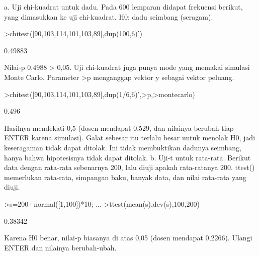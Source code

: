 \documentclass[a4paper,10pt]{article}
\begin{document}
\begin{eulernotebook}
\begin{eulercomment}
\begin{eulercomment}
\begin{eulercomment}
\begin{eulercomment}
\begin{eulercomment}
\begin{eulercomment}
\begin{eulercomment}
\begin{eulercomment}
\begin{eulercomment}
\begin{eulercomment}
\begin{eulercomment}
\begin{eulercomment}
\begin{eulercomment}
\begin{eulercomment}
\begin{eulercomment}
\begin{eulercomment}
\begin{eulercomment}
\begin{eulercomment}
\begin{eulercomment}
\begin{eulercomment}
\begin{eulercomment}
\begin{eulercomment}
\begin{eulercomment}
\end{eulercomment}
\begin{eulercomment}
a. Uji chi-kuadrat untuk dadu. Pada 600 lemparan didapat frekuensi berikut, yang
dimasukkan ke uji chi-kuadrat. H0: dadu seimbang (seragam).
\end{eulercomment}
\begin{eulerprompt}
>chitest([90,103,114,101,103,89],dup(100,6)')
\end{eulerprompt}
\begin{euleroutput}
  0.49883
\end{euleroutput}
\begin{eulercomment}
Nilai-p 0,4988 \textgreater{} 0,05. Uji chi-kuadrat juga punya mode yang memakai simulasi Monte Carlo.
Parameter \textgreater{}p menganggap vektor y sebagai vektor peluang.
\end{eulercomment}
\begin{eulerprompt}
>chitest([90,103,114,101,103,89],dup(1/6,6)',>p,>montecarlo)
\end{eulerprompt}
\begin{euleroutput}
  0.496
\end{euleroutput}
\begin{eulercomment}
Hasilnya mendekati 0,5 (dosen mendapat 0,529, dan nilainya berubah tiap ENTER karena
simulasi). Galat sebesar itu terlalu besar untuk menolak H0, jadi keseragaman tidak dapat
ditolak. Ini tidak membuktikan dadunya seimbang, hanya bahwa hipotesisnya tidak dapat
ditolak.
b. Uji-t untuk rata-rata. Berikut data dengan rata-rata sebenarnya 200, lalu diuji apakah
rata-ratanya 200. ttest() memerlukan rata-rata, simpangan baku, banyak data, dan nilai
rata-rata yang diuji.
\end{eulercomment}
\begin{eulerprompt}
>s=200+normal([1,100])*10; ...
>ttest(mean(s),dev(s),100,200)
\end{eulerprompt}
\begin{euleroutput}
  0.38342
\end{euleroutput}
\begin{eulercomment}
Karena H0 benar, nilai-p biasanya di atas 0,05 (dosen mendapat 0,2266). Ulangi ENTER dan
nilainya berubah-ubah.


\end{eulercomment}
\end{eulercomment}
\end{eulercomment}
\end{eulercomment}
\end{eulercomment}
\end{eulercomment}
\end{eulercomment}
\end{eulercomment}
\end{eulercomment}
\end{eulercomment}
\end{eulercomment}
\end{eulercomment}
\end{eulercomment}
\end{eulercomment}
\end{eulercomment}
\end{eulercomment}
\end{eulercomment}
\end{eulercomment}
\end{eulercomment}
\end{eulercomment}
\end{eulercomment}
\end{eulercomment}
\end{eulercomment}
\end{eulernotebook}
\end{document}
